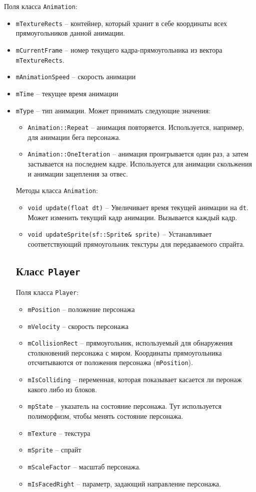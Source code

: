 \documentclass{article}
\begin{document}
Поля класса \texttt{Animation}:
\begin{itemize}
\item \texttt{mTextureRects} -- контейнер, который хранит в себе координаты всех прямоугольников данной анимации.
\item \texttt{mCurrentFrame} -- номер текущего кадра-прямоугольника из вектора \texttt{mTextureRects}.
\item \texttt{mAnimationSpeed} -- скорость анимации
\item \texttt{mTime} -- текущее время анимации
\item \texttt{mType} -- тип анимации. Может принимать следующие значения:
\begin{itemize}
\item \texttt{Animation::Repeat} -- анимация повторяется. Используется, например, для анимации бега персонажа.
\item \texttt{Animation::OneIteration} -- анимация проигрывается один раз, а затем застывается на последнем кадре. Используется для анимации скольжения и анимации зацепления за отвес.\\
\end{itemize}

Методы класса \texttt{Animation}:

\begin{itemize}
\item \texttt{void update(float dt)} -- Увеличивает время текущей анимации на \texttt{dt}. Может изменить текущий кадр анимации. Вызывается каждый кадр.
\item \texttt{void updateSprite(sf::Sprite\& sprite)} -- Устанавливает соответствующий прямоугольник текстуры для передаваемого спрайта.

\end{itemize}


\subsection*{Класс \texttt{Player}}
Поля класса \texttt{Player}:
\begin{itemize}
\item \texttt{mPosition} -- положение персонажа
\item \texttt{mVelocity} -- скорость персонажа
\item \texttt{mCollisionRect} -- прямоугольник, используемый для обнаружения столкновений персонажа с миром. Координаты прямоугольника отсчитываются от положения персонажа (\texttt{mPosition}).
\item \texttt{mIsColliding} -- переменная, которая показывает касается ли перонаж какого либо из блоков.
\item \texttt{mpState} -- указатель на состояние персонажа. Тут используется полиморфизм, чтобы менять состояние персонажа.
\item \texttt{mTexture} -- текстура
\item \texttt{mSprite} -- спрайт
\item \texttt{mScaleFactor} -- масштаб персонажа.
\item \texttt{mIsFacedRight} -- параметр, задающий направление персонажа.
\end{itemize}


\end{itemize}
\end{document}
